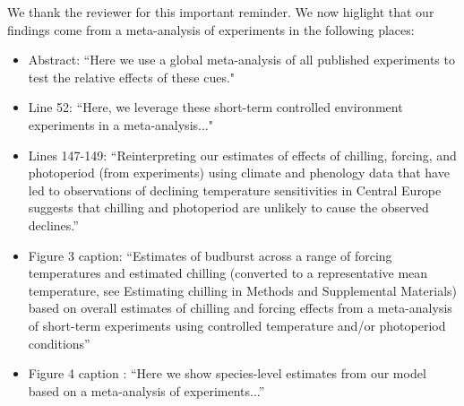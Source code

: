 \documentclass{article}
\begin{document}
\par We thank the reviewer for this important reminder. We now higlight that our findings come from a meta-analysis of experiments in the following places:
\begin{itemize}
\item Abstract: ``Here we use a global meta-analysis of all published experiments to test the relative effects of these cues."
\item Line 52: ``Here, we leverage these short-term controlled environment experiments in a meta-analysis..."
\item Lines 147-149: ``Reinterpreting our estimates of effects of chilling, forcing, and photoperiod (from experiments) using climate and phenology data that have led to observations of declining temperature sensitivities in Central Europe suggests that chilling and photoperiod are unlikely to cause the observed declines.''
\item Figure 3 caption: ``Estimates of budburst across a range of forcing temperatures and estimated chilling (converted to a representative mean temperature, see Estimating chilling in Methods and Supplemental Materials) based on overall estimates of chilling and forcing effects from a meta-analysis
of short-term experiments using controlled temperature and/or photoperiod conditions''
\item Figure 4 caption : ``Here we show species-level estimates from our model based on a meta-analysis of experiments...''
\end{itemize}
\end{document}
